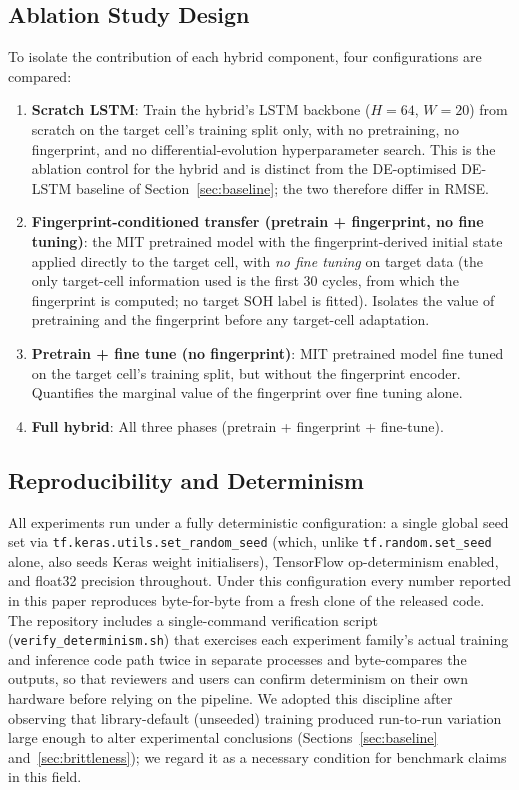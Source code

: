 \subsection{Ablation Study Design}\label{sec:ablation_design}

To isolate the contribution of each hybrid component, four configurations
are compared:
\begin{enumerate}
  \item \textbf{Scratch LSTM}: Train the hybrid's LSTM backbone
        ($H{=}64$, $W{=}20$) from scratch on the target cell's training split
        only, with no pretraining, no fingerprint, and no differential-evolution
        hyperparameter search. This is the ablation control for the hybrid and is
        distinct from the DE-optimised DE-LSTM baseline of
        Section~\ref{sec:baseline}; the two therefore differ in RMSE.
  \item \textbf{Fingerprint-conditioned transfer (pretrain + fingerprint, no fine tuning)}: the MIT
        pretrained model with the fingerprint-derived initial state applied
        directly to the target cell, with \textit{no fine tuning} on target
        data (the only target-cell information used is the first 30 cycles, from
        which the fingerprint is computed; no target SOH label is fitted).
        Isolates the value of pretraining and the fingerprint before any
        target-cell adaptation.
  \item \textbf{Pretrain + fine tune (no fingerprint)}: MIT pretrained
        model fine tuned on the target cell's training split, but without
        the fingerprint encoder.
        Quantifies the marginal value of the fingerprint over fine tuning alone.
  \item \textbf{Full hybrid}: All three phases (pretrain + fingerprint + fine-tune).
\end{enumerate}

\subsection{Reproducibility and Determinism}\label{sec:repro}

All experiments run under a fully deterministic configuration: a single
global seed set via \texttt{tf.keras.utils.set\_random\_seed} (which, unlike
\texttt{tf.random.set\_seed} alone, also seeds Keras weight initialisers),
TensorFlow op-determinism enabled, and float32 precision throughout.
Under this configuration every number reported in this paper reproduces
byte-for-byte from a fresh clone of the released code.
The repository includes a single-command verification script
(\texttt{verify\_determinism.sh}) that exercises each experiment family's
actual training and inference code path twice in separate processes and
byte-compares the outputs, so that reviewers and users can confirm
determinism on their own hardware before relying on the pipeline.
We adopted this discipline after observing that library-default (unseeded)
training produced run-to-run variation large enough to alter experimental
conclusions (Sections~\ref{sec:baseline} and~\ref{sec:brittleness}); we
regard it as a necessary condition for benchmark claims in this field.
